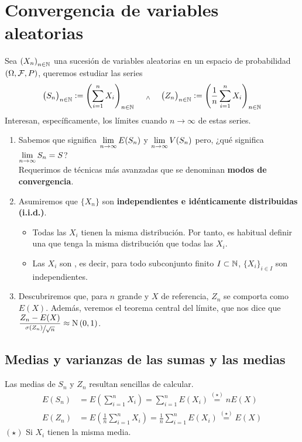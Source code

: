 
\section{Convergencia de variables aleatorias}

Sea $\displaystyle \left(X_n\right)_{n \in \mathbb{N}}$ una sucesión de variables aleatorias en un espacio de probabilidad $(\Omega, \mathcal{F}, P)$, queremos estudiar las series
\[\big(S_n\big)_{n\in \mathbb{N}}  \vcentcolon=\left(\sum_{i=1}^{n} X_i\right)_{n \in \mathbb{N}} \quad \; _{\wedge} \; \quad \big(Z_n\big)_{n\in \mathbb{N}} \vcentcolon= \left(\frac{1}{n}\sum_{i=1}^{n} X_i\right)_{n \in \mathbb{N}}\]
Interesan, específicamente, los límites cuando $n\to \infty$ de estas series.
\begin{enumerate}
	\item Sabemos que significa $\displaystyle \lim_{n\to\infty} E(S_n)$ y $\displaystyle \lim_{n\to\infty} V(S_n)$ pero, ¿qué significa $\displaystyle \lim_{n\to\infty} S_n = S$? \\
	      Requerimos de técnicas más avanzadas que se denominan \textbf{modos de convergencia}.
	\item Asumiremos que $\{X_n\}$ son \textbf{independientes e idénticamente distribuidas (i.i.d.)}.
	      \begin{itemize}
		      \item Todas las $X_i$ tienen la misma distribución. Por tanto, es habitual definir una  que tenga la misma distribución que todas las $X_i$.
		      \item Las $X_i$ son , es decir, para todo subconjunto finito $I \subset \mathbb{N}$, $\{X_i\}_{i\in I}$ son independientes.
	      \end{itemize}
	\item Descubriremos que, para $n$ grande y $X$ de referencia, $Z_n$ se comporta como $E(X)$. Además, veremos el teorema central del límite, que nos dice que $\displaystyle \frac{Z_n-E(X)}{\sfrac{\sigma(Z_n)}{\sqrt{n}}} \approx \operatorname{N}\left(0,1\right)$.
\end{enumerate}
\subsection{Medias y varianzas de las sumas y las medias}
Las medias de $S_n$ y $Z_n$ resultan sencillas de calcular.
\[\begin{aligned}
		E(S_n) & = E\left(\sum_{i=1}^{n} X_i\right) = \sum_{i=1}^{n} E(X_i) \stackrel{(\star)}{=} nE(X)                      \\
		E(Z_n) & = E\left(\frac{1}{n}\sum_{i=1}^{n} X_i\right) = \frac{1}{n}\sum_{i=1}^{n} E(X_i) \stackrel{(\star)}{=} E(X)
	\end{aligned}\]
\hspace*{\fill} $(\star)$ Si $X_i$ tienen la misma media.

